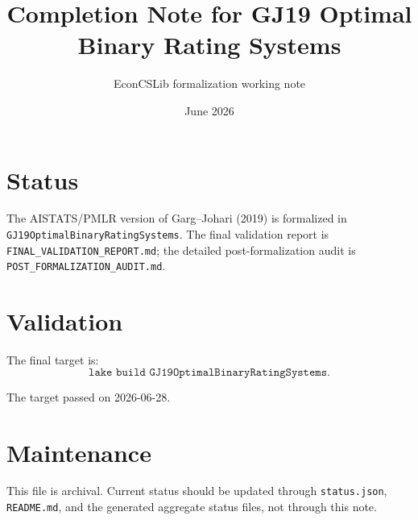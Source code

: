\documentclass[11pt]{article}
\title{Completion Note for GJ19 Optimal Binary Rating Systems}
\author{EconCSLib formalization working note}
\date{June 2026}
\begin{document}
\maketitle

\section{Status}

The AISTATS/PMLR version of Garg--Johari (2019) is formalized in
\texttt{GJ19OptimalBinaryRatingSystems}.  The final validation report is
\texttt{FINAL\_VALIDATION\_REPORT.md}; the detailed post-formalization audit
is \texttt{POST\_FORMALIZATION\_AUDIT.md}.

\section{Validation}

The final target is:
\[
\texttt{lake build GJ19OptimalBinaryRatingSystems}.
\]

The target passed on 2026-06-28.

\section{Maintenance}

This file is archival.  Current status should be updated through
\texttt{status.json}, \texttt{README.md}, and the generated aggregate status
files, not through this note.
\end{document}
